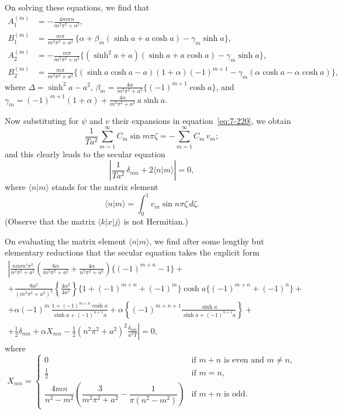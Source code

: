 On solving these equations, we find that
\begin{align}
\label{eq:7-207a}
A_1^{(m)} &= -\frac{4m\pi\alpha}{m^2\pi^2+a^2}, \nonumber\\
B_1^{(m)} &= \frac{m\pi}{m^2\pi^2+a^2}\,
\{\alpha+\beta_m(\sinh a + a\cosh a)-\gamma_m\sinh a\}, \nonumber\\
A_2^{(m)} &= -\frac{m\pi}{m^2\pi^2+a^2}
\{(\sinh^2 a + a)(\sinh a + a\cosh a)-\gamma_m \sinh a\}, \nonumber\\
B_2^{(m)} &= \frac{m\pi}{m^2\pi^2+a^2}
\{(\sinh a\cosh a - a)(1+\alpha)(-1)^{m+1} - \gamma_m(\alpha\cosh a - \alpha\cosh a)\},
\end{align}
where
$\Delta = \sinh^2 a - a^2$,
$\beta_m = \frac{4\alpha}{m^2\pi^2+a^2}\{(-1)^{m+1}\cosh a\}$,
and
$\gamma_m = (-1)^{m+1}(1+\alpha) + \frac{4\alpha}{m^2\pi^2+a^2}\, a\sinh a$.

Now substituting for $\psi$ and $v$ their expansions in equation~\eqref{eq:7-220}, we
obtain
\begin{equation}
\label{eq:7-225}
\frac{1}{Ta^2}\sum_{m=1}^{\infty} C_m \sin m\pi\zeta
= -\sum_{m=1}^{\infty} C_m\, v_m;
\end{equation}
and this clearly leads to the secular equation
\begin{equation}
\label{eq:7-226}
\left|\frac{1}{Ta^2}\,\delta_{mn}
+2\langle n|m\rangle\right| = 0,
\end{equation}
where $\langle n|m\rangle$ stands for the matrix element
\begin{equation}
\label{eq:7-227}
\langle n|m\rangle = \int_0^1 v_m \sin n\pi\zeta\,d\zeta.
\end{equation}
(Observe that the matrix $\langle k|x|j\rangle$ is not Hermitian.)

On evaluating the matrix element $\langle n|m\rangle$, we find after some lengthy but
elementary reductions that the secular equation takes the explicit form
\begin{multline}
\label{eq:7-228}
\left|
\frac{nmm'\pi^2}{n^2\pi^2+a^2}\left(\frac{6\alpha}{m^2\pi^2+a^2}
+ \frac{4\alpha}{n^2\pi^2+a^2}\right)
\{(-1)^{m+n}-1\} + \right. \\
+ \frac{8a^2}{(m^2\pi^2+a^2)^2}\left\{
\frac{4\alpha^2}{4a^2}\right\}
\{1+(-1)^{m+n}+(-1)^m\}
\cosh a\{(-1)^{m+n}+(-1)^n\} + \\
+\alpha(-1)^m\,
\frac{1+(-1)^{m+n}\cosh a}{\sinh a + (-1)^{n+1}a}
+\alpha\left\{(-1)^{m+n+1}\frac{\sinh a}{\sinh a + (-1)^{n+1}a}\right\} + \\
\left.+\tfrac{1}{2}\delta_{mn}+\alpha X_{mn}
-\tfrac{1}{2}(n^2\pi^2+a^2)^2\frac{\delta_{mn}}{a^2 T}\right| = 0,
\end{multline}
where
\begin{equation}
\label{eq:7-229}
X_{mn} = \begin{cases}
0 & \text{if } m+n \text{ is even and } m \neq n,\\
\frac{1}{2} & \text{if } m = n,\\
\dfrac{4mn}{n^2-m^2}\left(\dfrac{3}{m^2\pi^2+a^2}
- \dfrac{1}{\pi(n^2-m^2)}\right) & \text{if } m+n \text{ is odd.}
\end{cases}
\end{equation}

